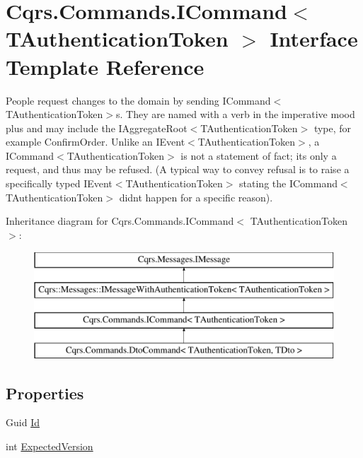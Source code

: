 \hypertarget{interfaceCqrs_1_1Commands_1_1ICommand}{}\section{Cqrs.\+Commands.\+I\+Command$<$ T\+Authentication\+Token $>$ Interface Template Reference}
\label{interfaceCqrs_1_1Commands_1_1ICommand}


People request changes to the domain by sending I\+Command$<$\+T\+Authentication\+Token$>$s. They are named with a verb in the imperative mood plus and may include the I\+Aggregate\+Root$<$\+T\+Authentication\+Token$>$ type, for example Confirm\+Order. Unlike an I\+Event$<$\+T\+Authentication\+Token$>$, a I\+Command$<$\+T\+Authentication\+Token$>$ is not a statement of fact; it\textquotesingle{}s only a request, and thus may be refused. (A typical way to convey refusal is to raise a specifically typed I\+Event$<$\+T\+Authentication\+Token$>$ stating the I\+Command$<$\+T\+Authentication\+Token$>$ didn\textquotesingle{}t happen for a specific reason).  


Inheritance diagram for Cqrs.\+Commands.\+I\+Command$<$ T\+Authentication\+Token $>$\+:\begin{figure}[H]
\begin{center}
\leavevmode
\includegraphics[height=4.000000cm]{interfaceCqrs_1_1Commands_1_1ICommand}
\end{center}
\end{figure}
\subsection*{Properties}
\begin{DoxyCompactItemize}
\item 
Guid \hyperlink{interfaceCqrs_1_1Commands_1_1ICommand_a79acca2013a08295cef32f1917d97e96_a79acca2013a08295cef32f1917d97e96}{Id}
\item 
int \hyperlink{interfaceCqrs_1_1Commands_1_1ICommand_a8b207da81f36bd4426e83e2ec948eb49_a8b207da81f36bd4426e83e2ec948eb49}{Expected\+Version}
\end{DoxyCompactItemize}


